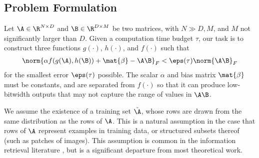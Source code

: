 \subsection{Problem Formulation} \label{sec:problemStatement}

Let $\A \in \R^{N \times D}$ and $\B \in \R^{D \times M}$ be two matrices, with $N \gg D, M$, and $M$ not significantly larger than $D$. Given a computation time budget $\tau$, our task is to
construct three functions $g(\cdot)$, $h(\cdot)$, and $f(\cdot)$ such that
\begin{align} \label{eq:objective}
    \norm{\alpha f(g(\A), h(\B)) + \mat{\beta} - \A\B}_F < \eps(\tau) \norm{\A\B}_F
\end{align}
for the smallest error $\eps(\tau)$ possible. The scalar $\alpha$ and bias matrix $\mat{\beta}$ must be constants, and are separated from $f(\cdot)$ so that it can produce low-bitwidth outputs that may not capture the range of values in $\A\B$. %


We assume the existence of a training set $\tilde{\A}$, whose rows are drawn from the same distribution as the rows of $\A$. This is a natural assumption in the case that rows of $\A$ represent examples in training data, or structured subsets thereof (such as patches of images). This assumption is common in the information retrieval literature \cite{bolt, pairq}, but is a significant departure from most theoretical work.





